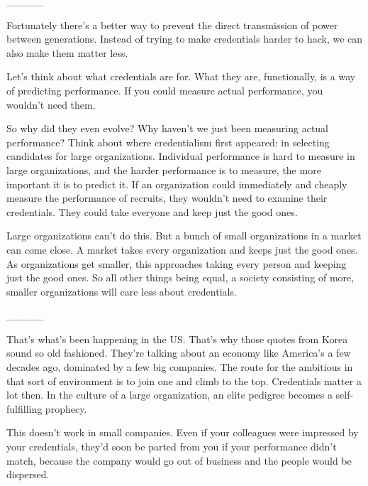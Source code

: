                   \_\_\_\_\_
                  

Fortunately there's a better way to prevent the
                  direct transmission of power between generations. Instead of
                  trying to make credentials harder to hack, we can also make
                  them matter less.

Let's think about what
                  credentials are for. What they are, functionally, is a way of
                  predicting performance. If you could measure actual
                  performance, you wouldn't need them.

So why did
                  they even evolve? Why haven't we just been measuring actual
                  performance? Think about where credentialism first appeared:
                  in selecting candidates for large organizations. Individual
                  performance is hard to measure in large organizations, and the
                  harder performance is to measure, the more important it is to
                  predict it. If an organization could immediately and cheaply
                  measure the performance of recruits, they wouldn't need to
                  examine their credentials. They could take everyone and keep
                  just the good ones.

Large organizations can't do
                  this. But a bunch of small organizations in a market can come
                  close. A market takes every organization and keeps just the
                  good ones. As organizations get smaller, this approaches
                  taking every person and keeping just the good ones. So all
                  other things being equal, a society consisting of more,
                  smaller organizations will care less about credentials.


                  \_\_\_\_\_
                  

That's what's been happening in the US. That's why
                  those quotes from Korea sound so old fashioned. They're
                  talking about an economy like America's a few decades ago,
                  dominated by a few big companies. The route for the ambitious
                  in that sort of environment is to join one and climb to the
                  top. Credentials matter a lot then. In the culture of a large
                  organization, an elite pedigree becomes a self-fulfilling
                  prophecy.

This doesn't work in small companies.
                  Even if your colleagues were impressed by your credentials,
                  they'd soon be parted from you if your performance didn't
                  match, because the company would go out of business and the
                  people would be dispersed.


